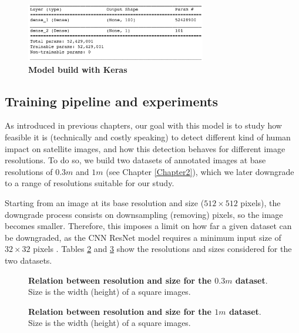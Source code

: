 \begin{figure}[h!]
	\centering
	\includegraphics[width=0.7\textwidth]{Figures/model_keras.png}
	\captionsetup{width=1\linewidth}
	\caption{\textbf{Model build with Keras}}
	\label{fig:model_keras}
\end{figure}


\subsection{Training pipeline and experiments}

As introduced in previous chapters, our goal with this model is to study how feasible it is (technically and costly speaking) to detect different kind of human impact on satellite images, and how this detection behaves for different image resolutions. To do so, we build two datasets of annotated images at base resolutions of $0.3m$ and $1m$ (see Chapter \ref{Chapter2}), which we later downgrade to a range of resolutions suitable for our study.

Starting from an image at its base resolution and size ($512\times512$ pixels), the downgrade process consists on downsampling (removing) pixels, so the image becomes smaller. Therefore, this imposes a limit on how far a given dataset can be downgraded, as the CNN ResNet model requires a minimum input size of $32\times32$ pixels \parencite{ResNetKeras}. Tables \ref{tab:resolutions_03m} and \ref{tab:resolutions_1m} show the resolutions and sizes considered for the two datasets.

\begin{figure}[h!]
	\centering
	
	\captionsetup{width=1\linewidth}
	\caption{\textbf{Relation between resolution and size for the $0.3m$ dataset}. Size is the width (height) of a square images.}
	\label{tab:resolutions_03m}
\end{figure}

\begin{figure}[h!]
	\centering
	
	\captionsetup{width=1\linewidth}
	\caption{\textbf{Relation between resolution and size for the $1m$ dataset}. Size is the width (height) of a square images.}
	\label{tab:resolutions_1m}
\end{figure}

